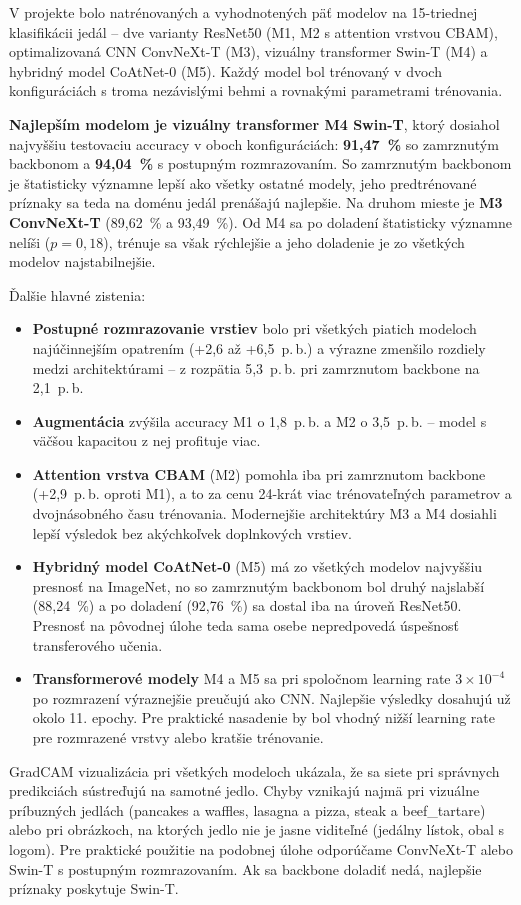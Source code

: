 V projekte bolo natrénovaných a vyhodnotených päť modelov na 15-triednej
klasifikácii jedál -- dve varianty ResNet50 (M1, M2 s attention vrstvou
CBAM), optimalizovaná CNN ConvNeXt-T (M3), vizuálny transformer Swin-T (M4)
a hybridný model CoAtNet-0 (M5). Každý model bol trénovaný v dvoch
konfiguráciách s troma nezávislými behmi a rovnakými parametrami
trénovania.

\textbf{Najlepším modelom je vizuálny transformer M4 Swin-T}, ktorý
dosiahol najvyššiu testovaciu accuracy v oboch konfiguráciách:
\textbf{91,47~\%} so zamrznutým backbonom a \textbf{94,04~\%} s postupným
rozmrazovaním. So zamrznutým backbonom je štatisticky významne lepší ako
všetky ostatné modely, jeho predtrénované príznaky sa teda na doménu jedál
prenášajú najlepšie. Na druhom mieste je \textbf{M3 ConvNeXt-T} (89,62~\%
a 93,49~\%). Od M4 sa po doladení štatisticky významne nelíši
($p = 0{,}18$), trénuje sa však rýchlejšie a jeho doladenie je zo všetkých
modelov najstabilnejšie.

Ďalšie hlavné zistenia:

\begin{itemize}
    \item \textbf{Postupné rozmrazovanie vrstiev} bolo pri všetkých piatich
          modeloch najúčinnejším opatrením (+2,6 až +6,5~p.\,b.)
          a výrazne zmenšilo rozdiely medzi architektúrami -- z rozpätia
          5,3~p.\,b. pri zamrznutom backbone na 2,1~p.\,b.
    \item \textbf{Augmentácia} zvýšila accuracy M1 o 1,8~p.\,b. a M2
          o 3,5~p.\,b. -- model s väčšou kapacitou z nej profituje viac.
    \item \textbf{Attention vrstva CBAM} (M2) pomohla iba pri zamrznutom
          backbone (+2,9~p.\,b. oproti M1), a to za cenu 24-krát viac
          trénovateľných parametrov a dvojnásobného času trénovania.
          Modernejšie architektúry M3 a M4 dosiahli lepší výsledok bez
          akýchkoľvek doplnkových vrstiev.
    \item \textbf{Hybridný model CoAtNet-0} (M5) má zo všetkých modelov
          najvyššiu presnosť na ImageNet, no so zamrznutým backbonom bol
          druhý najslabší (88,24~\%) a po doladení (92,76~\%) sa dostal
          iba na úroveň ResNet50. Presnosť na pôvodnej úlohe teda sama osebe
          nepredpovedá úspešnosť transferového učenia.
    \item \textbf{Transformerové modely} M4 a M5 sa pri spoločnom learning
          rate $3\times10^{-4}$ po rozmrazení výraznejšie preučujú ako
          CNN. Najlepšie výsledky dosahujú už okolo 11. epochy. Pre
          praktické nasadenie by bol vhodný nižší learning rate pre
          rozmrazené vrstvy alebo kratšie trénovanie.
\end{itemize}

GradCAM vizualizácia pri všetkých modeloch ukázala, že sa siete pri
správnych predikciách sústreďujú na samotné jedlo. Chyby vznikajú najmä pri
vizuálne príbuzných jedlách (pancakes a waffles, lasagna a pizza, steak
a beef\_tartare) alebo pri obrázkoch, na ktorých jedlo nie je jasne
viditeľné (jedálny lístok, obal s logom). Pre praktické použitie na podobnej
úlohe odporúčame ConvNeXt-T alebo Swin-T s postupným rozmrazovaním. Ak sa
backbone doladiť nedá, najlepšie príznaky poskytuje Swin-T.
